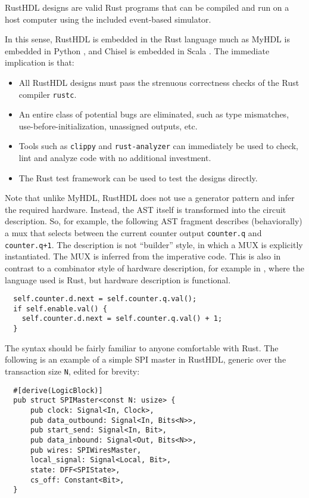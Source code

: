 \documentclass[sigplan,screen,sigconf]{acmart}
\begin{document}
\begin{tcolorbox}
RustHDL designs are valid Rust programs that can be compiled and run on a host computer
using the included event-based simulator.
\end{tcolorbox}

In this sense, RustHDL is embedded in the Rust language much as MyHDL is embedded in Python \cite{b3},
and Chisel is embedded in Scala \cite{b2}.  The immediate implication is that:
\begin{itemize}
  \item All RustHDL designs must pass the strenuous correctness checks of the Rust compiler \verb|rustc|.
  \item An entire class of potential bugs are eliminated, such as type mismatches, use-before-initialization,
  unassigned outputs, etc.
  \item Tools such as \verb|clippy| and \verb|rust-analyzer| can immediately be used to
  check, lint and analyze code with no additional investment.
  \item The Rust test framework can be used to test the designs directly.
\end{itemize}
Note that unlike MyHDL, RustHDL does not use a generator pattern and infer the required hardware.  Instead,
the AST itself is transformed into the circuit description.  So, for example, the following AST fragment describes
(behaviorally) a mux that selects between the current counter output \verb|counter.q| and \verb|counter.q+1|.  
The description is not ``builder'' style, in which a MUX is explicitly instantiated.  The MUX is inferred from
the imperative code.  This is also in contrast to a combinator style of hardware description, for example in \cite{b4b},
where the language used is Rust, but hardware description is functional.

\begin{verbatim}
  self.counter.d.next = self.counter.q.val();
  if self.enable.val() {
    self.counter.d.next = self.counter.q.val() + 1;
  }
\end{verbatim}

The syntax should be fairly familiar to anyone comfortable with Rust.  The following is an example
of a simple SPI master in RustHDL, generic over the transaction size \verb|N|, edited for brevity:

\begin{verbatim}
  #[derive(LogicBlock)]
  pub struct SPIMaster<const N: usize> {
      pub clock: Signal<In, Clock>,
      pub data_outbound: Signal<In, Bits<N>>,
      pub start_send: Signal<In, Bit>,
      pub data_inbound: Signal<Out, Bits<N>>,
      pub wires: SPIWiresMaster,
      local_signal: Signal<Local, Bit>,
      state: DFF<SPIState>,
      cs_off: Constant<Bit>,
  }
\end{verbatim}  
\end{document}
